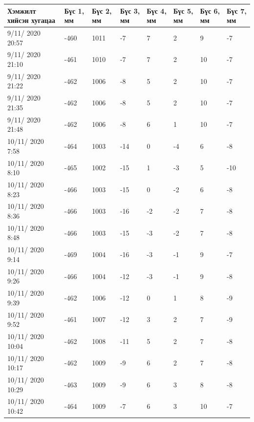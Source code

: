 \begin{table}[h]
    \centering
    \begin{tabular}{|p{3cm}|p{1cm}|p{1cm}|p{1cm}|p{1cm}|p{1cm}|p{1cm}|p{1cm}|}
         \hline
     Хэмжилт хийсэн хугацаа & Бүс 1, мм&	Бүс 2, мм&	Бүс 3, мм&	Бүс 4, мм&	Бүс 5, мм&	Бүс 6, мм&	Бүс 7, мм  \\ \hline
9/11/ 2020 20:57&	-460&	1011&	-7&	7&	2&	9&	-7 \\ \hline
9/11/ 2020 21:10&	-461&	1010&	-7&	7&	2&	10&	-7 \\ \hline
9/11/ 2020 21:22&	-462&	1006&	-8&	5&	2&	10&	-7 \\ \hline
9/11/ 2020 21:35&	-462&	1006&	-8&	5&	2&	10&	-7 \\ \hline
9/11/ 2020 21:48&	-462&	1006&	-8&	6&	1&	10&	-7 \\ \hline
10/11/ 2020 7:58&	-464&	1003&	-14&0&	-4&	6&	-8 \\ \hline
10/11/ 2020 8:10&	-465&	1002&	-15&1&	-3&	5&	-10 \\ \hline
10/11/ 2020 8:23&	-466&	1003&	-15&0&	-2&	6&	-8 \\ \hline
10/11/ 2020 8:36&	-466&	1003&	-16&-2&	-2&	7&	-8 \\ \hline
10/11/ 2020 8:48&	-466&	1003&	-15&-3&	-2&	7&	-8 \\ \hline
10/11/ 2020 9:14&	-469&	1004&	-16&-3&	-1&	9&	-7 \\ \hline
10/11/ 2020 9:26&	-466&	1004&	-12&-3&	-1&	9&	-8 \\ \hline
10/11/ 2020 9:39&	-462&	1006&	-12&0&	1&	8&	-9 \\ \hline
10/11/ 2020 9:52&	-461&	1007&	-12&3&	2&	7&	-9 \\ \hline
10/11/ 2020 10:04&	-462&	1008&	-11&5&	2&	7&	-8 \\ \hline
10/11/ 2020 10:17&	-462&	1009&	-9&	6&	2&	7&	-8 \\ \hline
10/11/ 2020 10:29&	-463&	1009&	-9&	6&	3&	8&	-8 \\ \hline
10/11/ 2020 10:42&	-464&	1009&	-7&	6&	3&	10&	-7 \\ \hline
    \end{tabular}
\end{table}